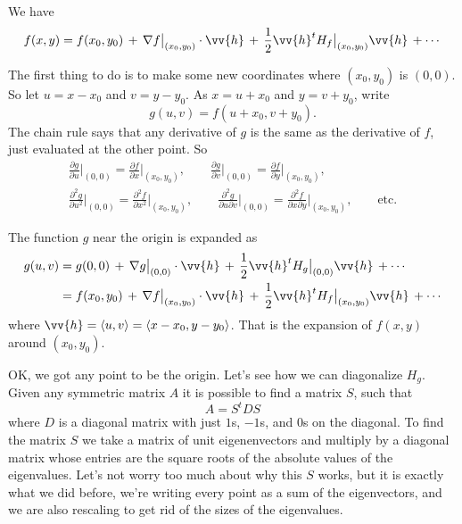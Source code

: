 \documentclass[12pt]{article}
\begin{document}
We have
$$
f(x,y) = f(x_0,y_0) \, + \,
\nabla f\big|_{(x_0,y_0)} \cdot \vv{h}
\, + \,
\frac{1}{2} \vv{h}^{t} H_f\big|_{(x_0,y_0)} \vv{h} \,
+ \cdots
$$

The first thing to do is to make some new coordinates where $(x_0,y_0)$ is
$(0,0)$.  So let $u = x-x_0$ and $v=y-y_0$.  As $x = u+x_0$ and $y = v+y_0$,
write
\begin{equation*}
g(u,v) = f(u+x_0,v+y_0).
\end{equation*}
The chain rule says that any derivative of $g$ is the same as the derivative
of $f$, just evaluated at the other point.  So
\begin{multline*}
\frac{\partial g}{\partial u}\Big|_{(0,0)} = 
\frac{\partial f}{\partial x}\Big|_{(x_0,y_0)}, \qquad
\frac{\partial g}{\partial v}\Big|_{(0,0)} = 
\frac{\partial f}{\partial y}\Big|_{(x_0,y_0)}, \\
\frac{\partial^2 g}{\partial u^2}\Big|_{(0,0)} = 
\frac{\partial^2 f}{\partial x^2}\Big|_{(x_0,y_0)}, \qquad
\frac{\partial^2 g}{\partial u \partial v}\Big|_{(0,0)} = 
\frac{\partial^2 f}{\partial x \partial y}\Big|_{(x_0,y_0)}, \qquad \text{etc.}
\end{multline*}

The function $g$ near the origin is expanded as
\begin{equation*}
\begin{split}
g(u,v) & = g(0,0) \, + \,
\nabla g\big|_{(0,0)} \cdot \vv{h}
\, + \,
\frac{1}{2} \vv{h}^{t} H_g\big|_{(0,0)} \vv{h} \,
+ \cdots
\\
& =
f(x_0,y_0) \, + \,
\nabla f\big|_{(x_0,y_0)} \cdot \vv{h}
\, + \,
\frac{1}{2} \vv{h}^{t} H_f\big|_{(x_0,y_0)} \vv{h} \,
+ \cdots
\end{split}
\end{equation*}
where $\vv{h} = \langle u,v \rangle = \langle x-x_0, y-y_0 \rangle$.
That is the expansion of $f(x,y)$ around $(x_0,y_0)$.

OK, we got any point to be the origin.  Let's see how we can diagonalize
$H_g$.  Given any symmetric matrix $A$ it is possible to find a matrix
$S$, such that
\begin{equation*}
A = S^t D S
\end{equation*}
where $D$ is a diagonal matrix with just $1$s, $-1$s, and $0$s on the
diagonal.  To find the matrix $S$ we take a matrix of unit eigenenvectors 
and multiply by a diagonal matrix whose entries are the square roots
of the absolute values of the eigenvalues.  Let's not worry too much about
why this $S$ works, but it is exactly what we did before, we're writing
every point as a sum of the eigenvectors, and we are also rescaling to
get rid of the sizes of the eigenvalues.
\end{document}
